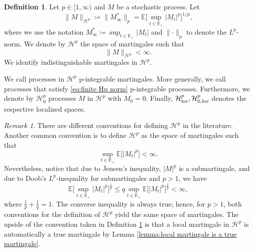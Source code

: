 \documentclass[11pt,a4paper,twoside,openany]{report}
\numberwithin{equation}{section}
\theoremstyle{plain} %
\theoremstyle{definition} %
\newtheorem{definition}[theorem]{Definition}
\theoremstyle{remark} %
\newtheorem{remark}[theorem]{Remark}
\begin{document}
\begin{definition}\label{def:H^p}
 Let \(p\in[1,\infty)\) and \(M\) be a stochastic process. Let
    \begin{equation*}
        \lVert M\rVert_{\mathcal{H}^p}\coloneqq \lVert M_\infty^*\rVert_{p}=\mathbb{E}\Big[\sup_{t\in\mathbb{R}_+}|M_t|^p\Big]^{1/p},
    \end{equation*}
    where we use the notation \(M^*_\infty\coloneqq\sup_{t\in\mathbb{R}_+}|M_t|\) and \(\lVert\cdot\rVert_p\) to denote the \(L^p\)-norm. We denote by \(\mathcal{H}^p\) the space of martingales such that 
    \begin{equation}\label{eq:finite Hp norm}
         \lVert M\rVert_{\mathcal{H}^p}<\infty.
    \end{equation}
    We identify indistinguishable martingales in \(\mathcal{H}^p\).
\end{definition}
We call processes in \(\mathcal{H}^p\) p-integrable martingales. More generally, we call processes that satisfy \eqref{eq:finite Hp norm} p-integrable processes. Furthermore, we denote by \(\mathcal{H}^p_0\) processes \(M\) in \(\mathcal{H}^p\) with \(M_0=0\). Finally, \(\mathcal{H}^p_{\rm{loc}},\mathcal{H}^p_{0,\rm{loc}}\) denotes the respective localized spaces.
\begin{remark}\label{rem:equivalence of H^p convetions}
 There are different conventions for defining \(\mathcal{H}^p\) in the literature. Another common convention is to define \(\mathcal{H}^p\) as the space of martingales such that 
    \begin{equation*}
        \sup_{t\in\mathbb{R}_+}\mathbb{E}\big[|M_t|^p\big]<\infty.
    \end{equation*}
    Nevertheless, notice that due to Jensen's inequality, \(|M|^p\) is a submartingale, and due to Doob's \(L^p\)-inequality for submartingales and \(p>1\), we have
    \begin{equation*}
        \mathbb{E}\Big[\sup_{t\in\mathbb{R}_+}|M_t|^p\Big]^{\frac{1}{p}}\leq q\sup_{t\in\mathbb{R}_+}\mathbb{E}\big[|M_t|^p\big]^{\frac{1}{p}}<\infty,
    \end{equation*}
    where \(\frac{1}{p}+\frac{1}{q}=1\). The converse inequality is always true; hence, for \(p>1\), both conventions for the definition of \(\mathcal{H}^p\) yield the same space of martingales. The upside of the convention taken in Definition \ref{def:H^p} is that a local martingale in \(\mathcal{H}^p\) is automatically a true martingale by Lemma \ref{lemma:local martingale is a true martingale}.
\end{remark}
\end{document}

